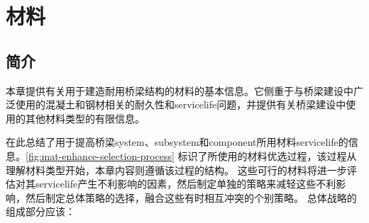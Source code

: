 \chapter{材料}\label{chp:materials}
\section{简介}
本章提供有关用于建造耐用桥梁结构的材料的基本信息。它侧重于与桥梁建设中广泛使用的混凝土和钢材相关的耐久性和\gls*{servicelife}问题，并提供有关桥梁建设中使用的其他材料类型的有限信息。

在此总结了用于提高桥梁\gls*{system}、\gls*{subsystem}和\gls*{component}所用材料\gls*{servicelife}的信息。\cref{fig:mat-enhance-selection-process} 标识了所使用的材料优选过程，该过程从理解材料类型开始，本章内容则遵循该过程的结构。 这些可行的材料将进一步评估对其\gls*{servicelife}产生不利影响的因素，然后制定单独的策略来减轻这些不利影响，然后制定总体策略的选择，融合这些有时相互冲突的个别策略。 总体战略的组成部分应该：

